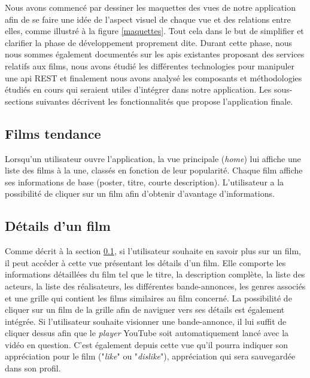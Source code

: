 Nous avons commencé par dessiner les maquettes des vues de notre application afin de se faire une idée de l'aspect visuel de chaque vue et des relations entre elles, comme illustré à la figure \ref{maquettes}. Tout cela dans le but de simplifier et clarifier la phase de développement proprement dite.
Durant cette phase, nous nous sommes également documentés sur les \acrshort{api}s existantes proposant des services relatifs aux films, nous avons étudié les différentes technologies pour manipuler une \acrshort{api} REST et finalement nous avons analysé les composants et méthodologies étudiés en cours qui seraient utiles d'intégrer dans notre application.
Les sous-sections suivantes décrivent les fonctionnalités que propose l'application finale.

\subsection{Films tendance}\label{films-tendance}
Lorsqu'un utilisateur ouvre l'application, la vue principale (\textit{home}) lui affiche une liste des films à la une, classés en fonction de leur popularité. Chaque film affiche ses informations de base (poster, titre, courte description). L'utilisateur a la possibilité de cliquer sur un film afin d'obtenir d'avantage d'informations.

\subsection{Détails d'un film}
Comme décrit à la section \ref{films-tendance}, si l'utilisateur souhaite en savoir plus sur un film, il peut accéder à cette vue présentant les détails d'un film. Elle comporte les informations détaillées du film tel que le titre, la description complète, la liste des acteurs, la liste des réalisateurs, les différentes bande-annonces, les genres associés et une grille qui contient les films similaires au film concerné. La possibilité de cliquer sur un film de la grille afin de naviguer vers ses détails est également intégrée.
Si l'utilisateur souhaite visionner une bande-annonce, il lui suffit de cliquer dessus afin que le \textit{player} YouTube soit automatiquement lancé avec la vidéo en question.
C'est également depuis cette vue qu'il pourra indiquer son appréciation pour le film ("\textit{like}" ou "\textit{dislike}"), appréciation qui sera sauvegardée dans son profil.

